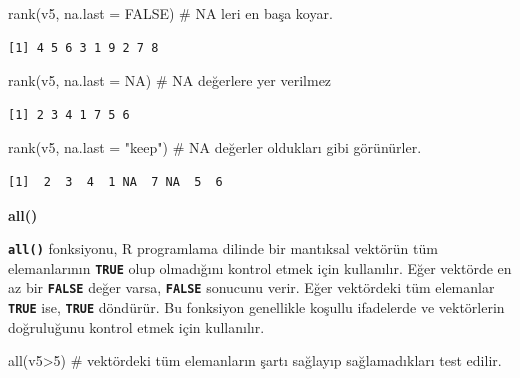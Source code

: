 \documentclass[
  letterpaper,
  DIV=11,
  numbers=noendperiod]{scrreprt}
\newenvironment{Shaded}{\begin{snugshade}}{\end{snugshade}}
\newcommand{\AttributeTok}[1]{\textcolor[rgb]{0.40,0.45,0.13}{#1}}
\newcommand{\CommentTok}[1]{\textcolor[rgb]{0.37,0.37,0.37}{#1}}
\newcommand{\ConstantTok}[1]{\textcolor[rgb]{0.56,0.35,0.01}{#1}}
\newcommand{\DecValTok}[1]{\textcolor[rgb]{0.68,0.00,0.00}{#1}}
\newcommand{\FunctionTok}[1]{\textcolor[rgb]{0.28,0.35,0.67}{#1}}
\newcommand{\NormalTok}[1]{\textcolor[rgb]{0.00,0.23,0.31}{#1}}
\newcommand{\SpecialCharTok}[1]{\textcolor[rgb]{0.37,0.37,0.37}{#1}}
\newcommand{\StringTok}[1]{\textcolor[rgb]{0.13,0.47,0.30}{#1}}
\begin{document}
\begin{Shaded}
\begin{Highlighting}[]
\FunctionTok{rank}\NormalTok{(v5, }\AttributeTok{na.last =} \ConstantTok{FALSE}\NormalTok{) }\CommentTok{\# NA leri en başa koyar.}
\end{Highlighting}
\end{Shaded}

\begin{verbatim}
[1] 4 5 6 3 1 9 2 7 8
\end{verbatim}

\begin{Shaded}
\begin{Highlighting}[]
\FunctionTok{rank}\NormalTok{(v5, }\AttributeTok{na.last =} \ConstantTok{NA}\NormalTok{) }\CommentTok{\# NA değerlere yer verilmez}
\end{Highlighting}
\end{Shaded}

\begin{verbatim}
[1] 2 3 4 1 7 5 6
\end{verbatim}

\begin{Shaded}
\begin{Highlighting}[]
\FunctionTok{rank}\NormalTok{(v5, }\AttributeTok{na.last =} \StringTok{"keep"}\NormalTok{) }\CommentTok{\# NA değerler oldukları gibi görünürler.}
\end{Highlighting}
\end{Shaded}

\begin{verbatim}
[1]  2  3  4  1 NA  7 NA  5  6
\end{verbatim}

\textbf{all()}

\textbf{\texttt{all()}} fonksiyonu, R programlama dilinde bir mantıksal
vektörün tüm elemanlarının \textbf{\texttt{TRUE}} olup olmadığını
kontrol etmek için kullanılır. Eğer vektörde en az bir
\textbf{\texttt{FALSE}} değer varsa, \textbf{\texttt{FALSE}} sonucunu
verir. Eğer vektördeki tüm elemanlar \textbf{\texttt{TRUE}} ise,
\textbf{\texttt{TRUE}} döndürür. Bu fonksiyon genellikle koşullu
ifadelerde ve vektörlerin doğruluğunu kontrol etmek için kullanılır.

\begin{Shaded}
\begin{Highlighting}[]
\FunctionTok{all}\NormalTok{(v5}\SpecialCharTok{\textgreater{}}\DecValTok{5}\NormalTok{) }\CommentTok{\# vektördeki tüm elemanların şartı sağlayıp sağlamadıkları test edilir.}
\end{Highlighting}
\end{Shaded}
\end{document}
